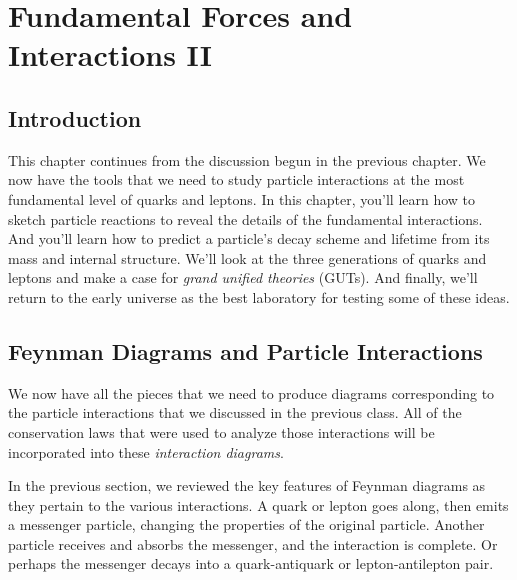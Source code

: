 
\chapter[Fund.\ Forces and Interactions II]{Fundamental Forces and Interactions II}
\label{chapter:interactions}

\section{Introduction}


This chapter continues from the discussion begun in the previous
chapter.  We now have the tools that we need to study particle
interactions at the most fundamental level of quarks and leptons.
In this chapter, you'll learn how to sketch particle reactions to
reveal the details of the fundamental interactions.  And you'll
learn how to predict a particle's decay scheme and lifetime from
its mass and internal structure.  We'll look at the three
generations of quarks and leptons and make a case for {\em grand
unified theories} (GUTs).  And finally, we'll return to the early
universe as the best laboratory for testing some of these ideas.


\section[Feynman diagrams]{Feynman Diagrams and Particle Interactions}

We now have all the pieces that we need to produce diagrams
corresponding to the particle interactions that we discussed in the
previous class.  All of the conservation laws that were used to
analyze those interactions will be incorporated into these
{\em interaction diagrams}.

In the previous section, we reviewed the key features of Feynman
diagrams as they pertain to the various interactions.  A quark or
lepton goes along, then emits a messenger particle, changing the
properties of the original particle.  Another particle receives and
absorbs the messenger, and the interaction is complete.  Or perhaps
the messenger decays into a quark-antiquark or lepton-antilepton pair.

